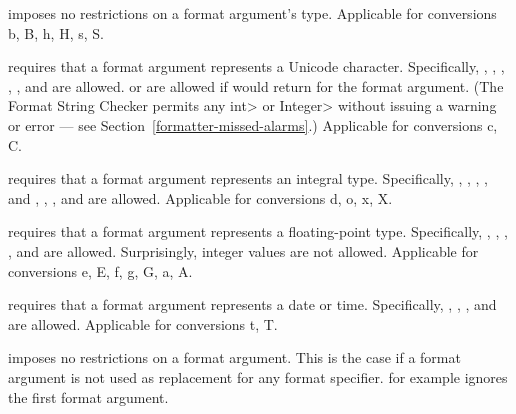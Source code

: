 \begin{description}
\item{} imposes no restrictions on a format argument's type. Applicable for
    conversions b, B, h, H, s, S.

\item{} requires that a format argument represents a Unicode character.
    Specifically, , , ,
    , , and  are allowed.
     or  are allowed if
     would return 
    for the format argument. (The Format String Checker permits any \<int>
    or \<Integer> without issuing a warning or error --- see
    Section~\ref{formatter-missed-alarms}.)
    Applicable for conversions c, C.

\item{} requires that a format argument represents an integral type. Specifically,
    , , , ,
     and , ,
    , and  are allowed. Applicable for
    conversions d, o, x, X.

\item{} requires that a format argument represents a floating-point type.  Specifically,
    , , ,
    , and  are allowed. Surprisingly, integer
    values are not allowed. Applicable for
    conversions e, E, f, g, G, a, A.

\item{} requires that a format argument represents a date or time.
    Specifically, , , , and
     are allowed.  Applicable for conversions t, T.

\item{} imposes no restrictions on a format argument. This is the case if a
    format argument is not used as replacement for any format specifier.
     for example ignores the first format argument.
\end{description}

